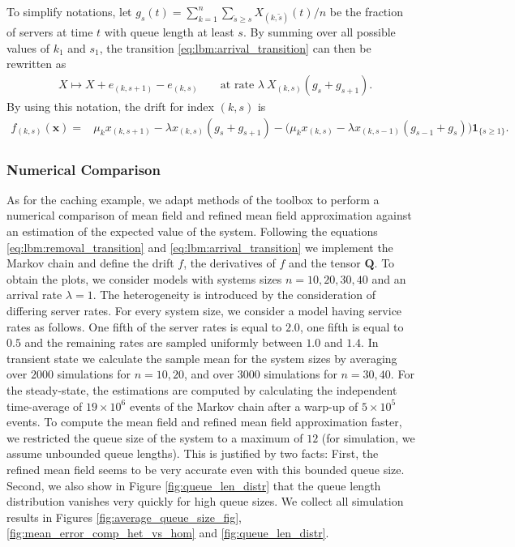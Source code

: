 \documentclass[acmsmall]{acmart}
\newcommand\bx{\mathbf{x}}
\newcommand\bQ{\mathbf{Q}}
\begin{document}
To simplify notations, let $g_{s}(t)= \sum_{k=1}^{n} \sum_{\tilde{s} \geq s} X_{(k,\tilde{s})}(t)/n$ be the fraction of servers at time $t$ with queue length at least $s$. By summing over all possible values of $k_1$ and $s_1$, the transition \eqref{eq:lbm:arrival_transition} can then be rewritten as 
\begin{align*}
  &X \mapsto X + e_{(k,s+1)} - e_{(k,s)} && \text{ at rate } \lambda \ X_{(k,s)} (g_{s} + g_{s+1}).
\end{align*}
By using this notation, the drift for index $(k,s)$ is
\begin{align*}
  f_{(k,s)}(\bx) = & \mu_k x_{(k,s+1)} - \lambda x_{(k,s)}(g_s+g_{s+1}) - \bigl( \mu_k x_{(k,s)}  - \lambda x_{(k,s-1)} (g_{s-1} + g_{s}) \bigr)\mathbf{1}_{\{s \geq1\}}.
\end{align*}


\subsubsection{Numerical Comparison}

As for the caching example, we adapt methods of the toolbox \cite{allmeier2021rmftool} to perform a numerical comparison of mean field and refined mean field approximation against an estimation of the expected value of the system. Following the equations  \eqref{eq:lbm:removal_transition} and \eqref{eq:lbm:arrival_transition} we implement the Markov chain and define the drift $f$, the derivatives of $f$ and the tensor $\bQ$. To obtain the plots, we consider models with systems sizes $n = 10, 20, 30, 40$ and an arrival rate $\lambda = 1$. The heterogeneity is introduced by the consideration of differing server rates. For every system size, we consider a model having service rates as follows. One fifth of the server rates is equal to $2.0$, one fifth is equal to $0.5$ and the remaining rates are sampled uniformly between $1.0$ and $1.4$. In transient state we calculate the sample mean for the system sizes by averaging over $2000$ simulations for $n=10,20$, and over $3000$ simulations for $n=30, 40$. For the steady-state, the estimations are computed by calculating the independent time-average of $19\times10^6$ events of the Markov chain after a warp-up of $5 \times10^5$ events. To compute the mean field and refined mean field approximation faster, we restricted the queue size of the system to a maximum of $12$ (for simulation, we assume unbounded queue lengths). This is justified by two facts: First, the refined mean field seems to be very accurate even with this bounded queue size. Second, we also show in Figure \ref{fig:queue_len_distr} that the queue length distribution vanishes very quickly for high queue sizes. We collect all simulation results in Figures \ref{fig:average_queue_size_fig}, \ref{fig:mean_error_comp_het_vs_hom} and \ref{fig:queue_len_distr}.
\end{document}
